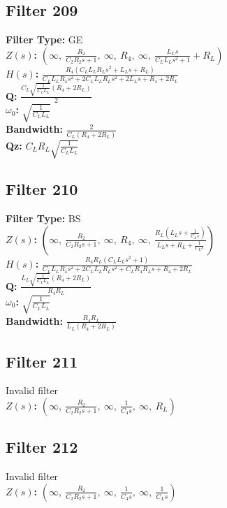 \documentclass{article}
\begin{document}
\subsection*{Filter 209}
\textbf{Filter Type:} GE \\ 
\textbf{$Z(s)$:} $\left( \infty, \  \frac{R_{2}}{C_{2} R_{2} s + 1}, \  \infty, \  R_{4}, \  \infty, \  \frac{L_{L} s}{C_{L} L_{L} s^{2} + 1} + R_{L}\right)$ \\ 
\textbf{$H(s)$:} $\frac{R_{4} \left(C_{L} L_{L} R_{L} s^{2} + L_{L} s + R_{L}\right)}{C_{L} L_{L} R_{4} s^{2} + 2 C_{L} L_{L} R_{L} s^{2} + 2 L_{L} s + R_{4} + 2 R_{L}}$ \\ 
\textbf{Q:} $\frac{C_{L} \sqrt{\frac{1}{C_{L} L_{L}}} \left(R_{4} + 2 R_{L}\right)}{2}$ \\ 
\textbf{$\omega_0$:} $\sqrt{\frac{1}{C_{L} L_{L}}}$ \\ 
\textbf{Bandwidth:} $\frac{2}{C_{L} \left(R_{4} + 2 R_{L}\right)}$ \\ 
\textbf{Qz:} $C_{L} R_{L} \sqrt{\frac{1}{C_{L} L_{L}}}$ \\ 
\subsection*{Filter 210}
\textbf{Filter Type:} BS \\ 
\textbf{$Z(s)$:} $\left( \infty, \  \frac{R_{2}}{C_{2} R_{2} s + 1}, \  \infty, \  R_{4}, \  \infty, \  \frac{R_{L} \left(L_{L} s + \frac{1}{C_{L} s}\right)}{L_{L} s + R_{L} + \frac{1}{C_{L} s}}\right)$ \\ 
\textbf{$H(s)$:} $\frac{R_{4} R_{L} \left(C_{L} L_{L} s^{2} + 1\right)}{C_{L} L_{L} R_{4} s^{2} + 2 C_{L} L_{L} R_{L} s^{2} + C_{L} R_{4} R_{L} s + R_{4} + 2 R_{L}}$ \\ 
\textbf{Q:} $\frac{L_{L} \sqrt{\frac{1}{C_{L} L_{L}}} \left(R_{4} + 2 R_{L}\right)}{R_{4} R_{L}}$ \\ 
\textbf{$\omega_0$:} $\sqrt{\frac{1}{C_{L} L_{L}}}$ \\ 
\textbf{Bandwidth:} $\frac{R_{4} R_{L}}{L_{L} \left(R_{4} + 2 R_{L}\right)}$ \\ 
\subsection*{Filter 211}
Invalid filter \\ 
\textbf{$Z(s)$:} $\left( \infty, \  \frac{R_{2}}{C_{2} R_{2} s + 1}, \  \infty, \  \frac{1}{C_{4} s}, \  \infty, \  R_{L}\right)$ \\ 
\subsection*{Filter 212}
Invalid filter \\ 
\textbf{$Z(s)$:} $\left( \infty, \  \frac{R_{2}}{C_{2} R_{2} s + 1}, \  \infty, \  \frac{1}{C_{4} s}, \  \infty, \  \frac{1}{C_{L} s}\right)$ \\ 
\end{document}
